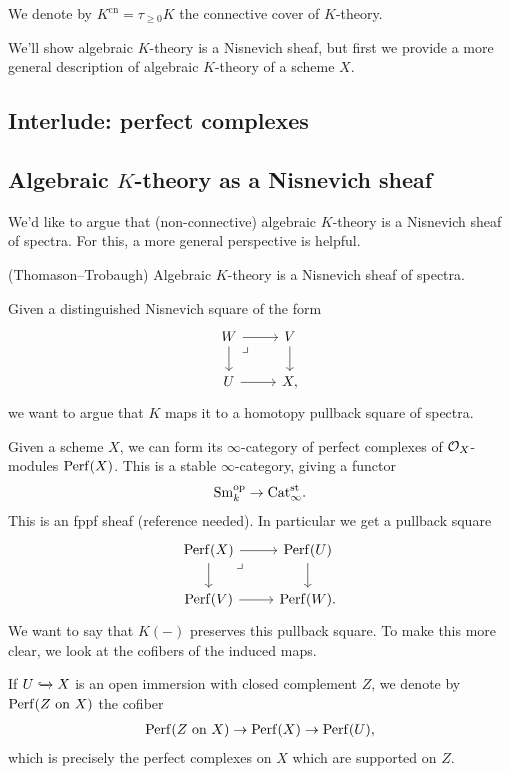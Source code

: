 \documentclass[11pt,openany]{book}
\providecommand{\cn}{\mathrm{cn}}
\begin{document}
\begin{notation} We denote by $K^\cn = \tau_{\ge 0} K$ the connective cover of $K$-theory.
\end{notation}

We'll show algebraic $K$-theory is a Nisnevich sheaf, but first we provide a more general description of algebraic $K$-theory of a scheme $X$.

\subsection{Interlude: perfect complexes}



\subsection{Algebraic $K$-theory as a Nisnevich sheaf}

We'd like to argue that (non-connective) algebraic $K$-theory is a Nisnevich sheaf of spectra. For this, a more general perspective is helpful.

\begin{theorem} (Thomason--Trobaugh) Algebraic $K$-theory is a Nisnevich sheaf of spectra.
\end{theorem}

Given a distinguished Nisnevich square of the form
\[ \begin{tikzcd}
    W\rar\dar\pb & V\dar\\
    U\rar & X,
\end{tikzcd} \]
we want to argue that $K$ maps it to a homotopy pullback square of spectra.

Given a scheme $X$, we can form its $\infty$-category of perfect complexes of $\mathcal{O}_X$-modules $\mathrm{Perf}(X)$. This is a stable $\infty$-category, giving a functor
\begin{align*}
    \mathrm{Sm}_k^{\mathrm{op}} \to \mathrm{Cat}_\infty^{\mathrm{st}}.
\end{align*}
%
This is an fppf sheaf (reference needed). In particular we get a pullback square
\[ \begin{tikzcd}
    \Perf(X)\rar\dar\pb & \Perf(U)\dar\\
    \Perf(V)\rar & \Perf(W).
\end{tikzcd} \]
We want to say that $K(-)$ preserves this pullback square. To make this more clear, we look at the cofibers of the induced maps.

\begin{notation} If $U \xhookrightarrow{} X$ is an open immersion with closed complement $Z$, we denote by $\mathrm{Perf}(Z\text{ on }X)$ the cofiber
\begin{align*}
    \mathrm{Perf}(Z\text{ on }X) \to \mathrm{Perf}(X) \to \mathrm{Perf}(U),
\end{align*}
which is precisely the perfect complexes on $X$ which are supported on $Z$.
\end{notation}
\end{document}
